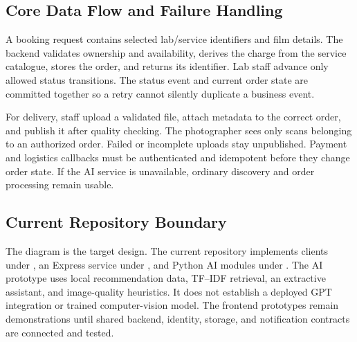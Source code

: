 \subsection{Core Data Flow and Failure Handling}
A booking request contains selected lab/service identifiers and film details.
The backend validates ownership and availability, derives the charge from the
service catalogue, stores the order, and returns its identifier. Lab staff
advance only allowed status transitions. The status event and current order
state are committed together so a retry cannot silently duplicate a business
event.

For delivery, staff upload a validated file, attach metadata to the correct
order, and publish it after quality checking. The photographer sees only scans
belonging to an authorized order. Failed or incomplete uploads stay unpublished.
Payment and logistics callbacks must be authenticated and idempotent before
they change order state. If the AI service is unavailable, ordinary discovery
and order processing remain usable.

\subsection{Current Repository Boundary}
The diagram is the target design. The current repository implements clients
under , an Express service under , and Python AI
modules under . The AI prototype uses local recommendation
data, TF--IDF retrieval, an extractive assistant, and image-quality heuristics.
It does not establish a deployed GPT integration or trained computer-vision
model. The frontend prototypes remain demonstrations until shared backend,
identity, storage, and notification contracts are connected and tested.
